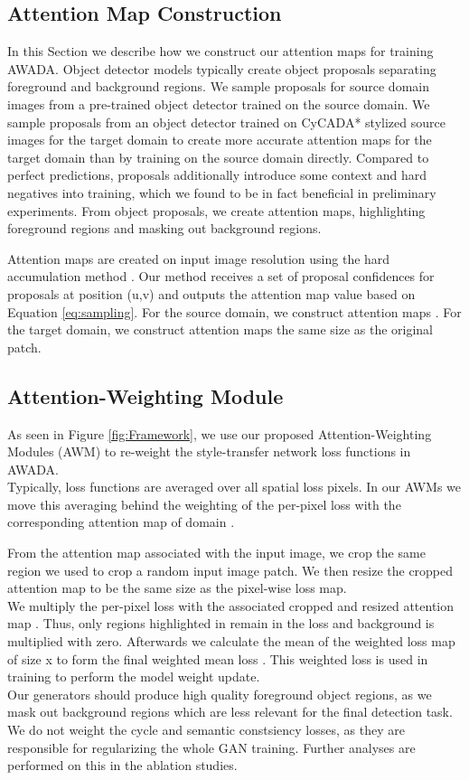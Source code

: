\documentclass[10pt,twocolumn,letterpaper]{article}
\begin{document}
\subsection{Attention Map Construction}
\label{sec:sampling}
In this Section we describe how we construct our attention maps for training AWADA. Object detector models typically create object proposals separating foreground and background regions. We sample proposals for source domain images from a pre-trained object detector trained on the source domain. We sample proposals from an object detector trained on CyCADA* stylized source images for the target domain to create more accurate attention maps for the target domain than by training on the source domain directly. Compared to perfect predictions, proposals additionally introduce some context and hard negatives into training, which we found to be in fact beneficial in preliminary experiments. From object proposals, we create attention maps, highlighting foreground regions and masking out background regions. 



Attention maps are created on input image resolution using the hard accumulation method . Our method receives a set  of proposal confidences  for proposals at position (u,v) and outputs the attention map value based on Equation \ref{eq:sampling}. For the source domain, we construct  attention maps . For the target domain, we construct  attention maps  the same size as the original patch.

\subsection{Attention-Weighting Module}

As seen in Figure \ref{fig:Framework}, we use our proposed Attention-Weighting Modules (AWM) to re-weight the style-transfer network loss functions in AWADA. \\
Typically, loss functions are averaged over all spatial loss pixels. In our AWMs we move this averaging behind the weighting of the per-pixel loss  with the corresponding attention map  of domain .



From the attention map associated with the input image, we crop the same region we used to crop a random input image patch. We then resize the cropped attention map to be the same size as the pixel-wise loss map.\\
We multiply the per-pixel loss  with the associated cropped and resized attention map . Thus, only regions highlighted in  remain in the loss and background is multiplied with zero. Afterwards we calculate the mean of the weighted loss map of size x to form the final weighted mean loss . This weighted loss is used in training to perform the model weight update.\\
Our generators should produce high quality foreground object regions, as we mask out background regions which are less relevant for the final detection task. We do not weight the cycle and semantic constsiency losses, as they are responsible for regularizing the whole GAN training. Further analyses are performed on this in the ablation studies.
\end{document}
